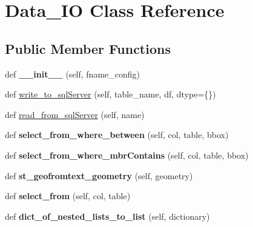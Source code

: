 \hypertarget{class_data___i_o_1_1_data___i_o}{}\section{Data\+\_\+\+IO Class Reference}
\label{class_data___i_o_1_1_data___i_o}
\subsection*{Public Member Functions}
\begin{DoxyCompactItemize}
\item 
\mbox{\label{class_data___i_o_1_1_data___i_o_a2c3f3798c40e8cb1f9ed65d04ee19236}} 
def {\bfseries \+\_\+\+\_\+init\+\_\+\+\_\+} (self, fname\+\_\+config)
\item 
def \hyperlink{class_data___i_o_1_1_data___i_o_adf0ca5cf816de8cfc624b287103b4f03}{write\+\_\+to\+\_\+sql\+Server} (self, table\+\_\+name, df, dtype=\{\})
\item 
def \hyperlink{class_data___i_o_1_1_data___i_o_a6af825f0682e54cbb22f57a189a6fcc8}{read\+\_\+from\+\_\+sql\+Server} (self, name)
\item 
\mbox{\label{class_data___i_o_1_1_data___i_o_ad07b011979322cd9aec6aa0a4370d525}} 
def {\bfseries select\+\_\+from\+\_\+where\+\_\+between} (self, col, table, bbox)
\item 
\mbox{\label{class_data___i_o_1_1_data___i_o_a6c4587c6494487c851d683869e3ec760}} 
def {\bfseries select\+\_\+from\+\_\+where\+\_\+mbr\+Contains} (self, col, table, bbox)
\item 
\mbox{\label{class_data___i_o_1_1_data___i_o_ab7a08a7ec816e305f8f9cfa0ef22293c}} 
def {\bfseries st\+\_\+geofromtext\+\_\+geometry} (self, geometry)
\item 
\mbox{\label{class_data___i_o_1_1_data___i_o_a2c90144978230ecac5dd96c117e99de4}} 
def {\bfseries select\+\_\+from} (self, col, table)
\item 
\mbox{\label{class_data___i_o_1_1_data___i_o_a1c62d4808ce8b7b0606e6c98319f9da3}} 
def {\bfseries dict\+\_\+of\+\_\+nested\+\_\+lists\+\_\+to\+\_\+list} (self, dictionary)
\end{DoxyCompactItemize}
